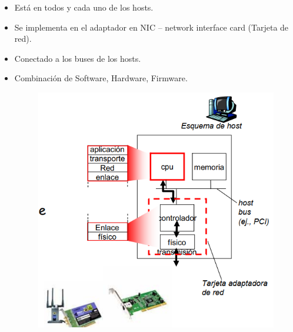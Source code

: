 \documentclass[12pt, twoside, openright]{report} %
\begin{document}
\begin{itemize}
	\item Está en todos y cada uno de los hosts.
	\item Se implementa en el adaptador en NIC -- network interface card
	      (Tarjeta de red).
	\item Conectado a los buses de los hosts.
	\item Combinación de Software, Hardware, Firmware.
	      \begin{figure}[H]
		      {\includegraphics[scale=.3]{Untitled 46.png}}
	      \end{figure}
\end{itemize}
\end{document}

